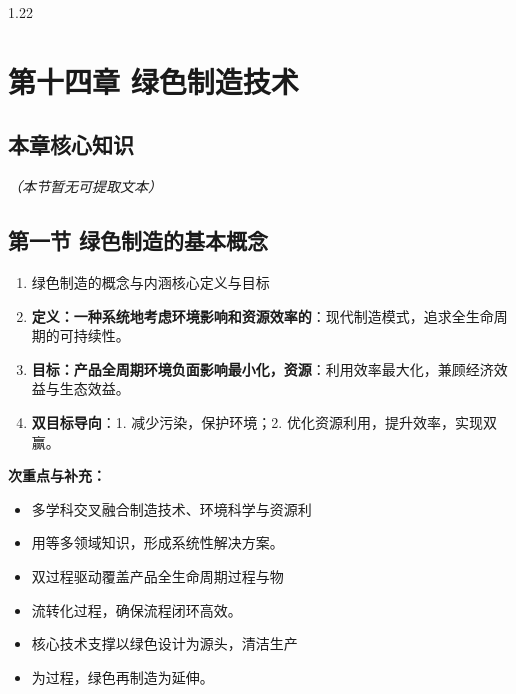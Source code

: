 \documentclass[12pt,a4paper]{article}
\begin{document}
\begin{spacing}{1.22}
\section{第十四章 绿色制造技术}
\subsection{本章核心知识}
\textit{（本节暂无可提取文本）}

\subsection{第一节 绿色制造的基本概念}
\begin{tcolorbox}[colback=yellow!6,colframe=red!55!black,title=重点,left=1mm,right=1mm]
\begin{enumerate}[leftmargin=2.2em,label=\arabic*.]
  \item 绿色制造的概念与内涵核心定义与目标
  \item \textbf{定义：一种系统地考虑环境影响和资源效率的}：现代制造模式，追求全生命周期的可持续性。
  \item \textbf{目标：产品全周期环境负面影响最小化，资源}：利用效率最大化，兼顾经济效益与生态效益。
  \item \textbf{双目标导向}：1. 减少污染，保护环境；2. 优化资源利用，提升效率，实现双赢。
\end{enumerate}
\end{tcolorbox}
\noindent\textbf{次重点与补充：}
\begin{itemize}[leftmargin=2.2em,label=--]
  \item 多学科交叉融合制造技术、环境科学与资源利
  \item 用等多领域知识，形成系统性解决方案。
  \item 双过程驱动覆盖产品全生命周期过程与物
  \item 流转化过程，确保流程闭环高效。
  \item 核心技术支撑以绿色设计为源头，清洁生产
  \item 为过程，绿色再制造为延伸。
\end{itemize}


\end{spacing}
\end{document}
